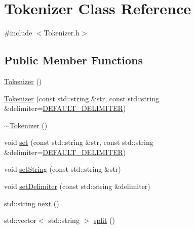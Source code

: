 \hypertarget{classTokenizer}{\section{\-Tokenizer \-Class \-Reference}
\label{classTokenizer}
}


{\ttfamily \#include $<$\-Tokenizer.\-h$>$}

\subsection*{\-Public \-Member \-Functions}
\begin{DoxyCompactItemize}
\item 
\hyperlink{classTokenizer_a2a6c04ea8c784f66bebcb6df7073769c}{\-Tokenizer} ()
\item 
\hyperlink{classTokenizer_a9a1032c0119ac10fa0d5d4d2a78dca85}{\-Tokenizer} (const std\-::string \&str, const std\-::string \&delimiter=\hyperlink{Tokenizer_8h_a0094ad88ed14f7e4808ab7772527692b}{\-D\-E\-F\-A\-U\-L\-T\-\_\-\-D\-E\-L\-I\-M\-I\-T\-E\-R})
\item 
\hyperlink{classTokenizer_a3f60f887953edf0f95ba5f36102f7017}{$\sim$\-Tokenizer} ()
\item 
void \hyperlink{classTokenizer_a628160e610ae90701a895afa925257eb}{set} (const std\-::string \&str, const std\-::string \&delimiter=\hyperlink{Tokenizer_8h_a0094ad88ed14f7e4808ab7772527692b}{\-D\-E\-F\-A\-U\-L\-T\-\_\-\-D\-E\-L\-I\-M\-I\-T\-E\-R})
\item 
void \hyperlink{classTokenizer_ae24b46461d7eaa8f699d03a2e2da5b68}{set\-String} (const std\-::string \&str)
\item 
void \hyperlink{classTokenizer_a3cc36e98c6d2e2ad8e8e1ce65ecdc0f3}{set\-Delimiter} (const std\-::string \&delimiter)
\item 
std\-::string \hyperlink{classTokenizer_a9c7241ad13ef914fbd2fe7be768c31b8}{next} ()
\item 
std\-::vector$<$ std\-::string $>$ \hyperlink{classTokenizer_a6c9b350c01903b62e03d787f21696e58}{split} ()
\end{DoxyCompactItemize}


